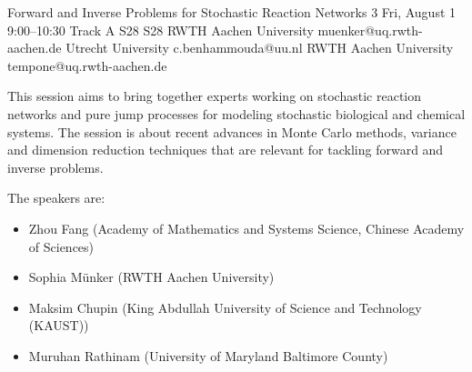 \begin{talk}
  {Forward and Inverse Problems for Stochastic Reaction Networks}%
  {3}%
  {}%
  {}%
  {}%
  {}%
  {Fri, August 1 9:00–10:30 Track A}%
  {S28}%
  {S28}%
  {%
    {RWTH Aachen University}%
    {muenker@uq.rwth-aachen.de}}%
  {%
	{Utrecht University}%
	{c.benhammouda@uu.nl}}%
  {%
	{RWTH Aachen University}%
	{tempone@uq.rwth-aachen.de}}%

This session aims to bring together experts working on stochastic reaction networks and pure jump processes for modeling stochastic biological and chemical systems. The session is about recent advances in Monte Carlo methods, variance and dimension reduction techniques that are relevant for tackling forward and inverse problems.

\medskip
The speakers are:
\begin{itemize}
    \item Zhou Fang (Academy of Mathematics and Systems Science, Chinese Academy of Sciences)
    \item Sophia Münker (RWTH Aachen University)
    \item Maksim Chupin (King Abdullah University of Science and Technology (KAUST))
    \item Muruhan Rathinam (University of Maryland Baltimore County)
\end{itemize}
  
\end{talk}

